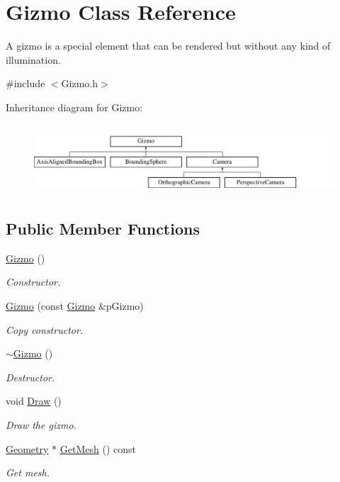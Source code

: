 \hypertarget{class_gizmo}{\section{Gizmo Class Reference}
\label{class_gizmo}
}


A gizmo is a special element that can be rendered but without any kind of illumination.  




{\ttfamily \#include $<$Gizmo.\+h$>$}

Inheritance diagram for Gizmo\+:\begin{figure}[H]
\begin{center}
\leavevmode
\includegraphics[height=2.608696cm]{class_gizmo}
\end{center}
\end{figure}
\subsection*{Public Member Functions}
\begin{DoxyCompactItemize}
\item 
\hyperlink{class_gizmo_a869c5618918e6a7d307017db4ced617f}{Gizmo} ()
\begin{DoxyCompactList}\small\item\em Constructor. \end{DoxyCompactList}\item 
\hyperlink{class_gizmo_a7ab775681e41082c52c11fa1eeb053ff}{Gizmo} (const \hyperlink{class_gizmo}{Gizmo} \&p\+Gizmo)
\begin{DoxyCompactList}\small\item\em Copy constructor. \end{DoxyCompactList}\item 
\hyperlink{class_gizmo_a308e8302907f2e51e05528f3473943a0}{$\sim$\+Gizmo} ()
\begin{DoxyCompactList}\small\item\em Destructor. \end{DoxyCompactList}\item 
void \hyperlink{class_gizmo_ab5ad6839e6387221d8f9ab3a17ba62f5}{Draw} ()
\begin{DoxyCompactList}\small\item\em Draw the gizmo. \end{DoxyCompactList}\item 
\hyperlink{class_geometry}{Geometry} $\ast$ \hyperlink{class_gizmo_a57b1c05ae3543998667896e4f967a022}{Get\+Mesh} () const 
\begin{DoxyCompactList}\small\item\em Get mesh. \end{DoxyCompactList}\end{DoxyCompactItemize}
